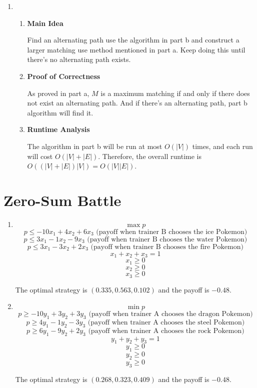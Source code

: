 \documentclass[11pt]{article}
\newenvironment{qparts}{\begin{enumerate}[{(}a{)}]}{\end{enumerate}}
\begin{document}
\begin{qparts}
\begin{enumerate}
		The modified BFS will not change overall runtime. Therefore it is $O(|V| + |E|)$.
		
	\end{enumerate}
	
	\item
	\renewcommand{\theenumii}{\roman{enumii}}
	\begin{enumerate}
		\item \textbf{Main Idea}
		
		Find an alternating path use the algorithm in part b and construct a larger matching use method mentioned in part a.
		Keep doing this until there's no alternating path exists.
		
		\item \textbf{Proof of Correctness}
		
		As proved in part a, $M$ is a maximum matching if and only if there does not exist an alternating path. And if there's an alternating path, part b algorithm will find it.
		
		\item \textbf{Runtime Analysis}
		
		The algorithm in part b will be run at most $O(|V|)$ times, and each run will cost $O(|V| + |E|)$.
		Therefore, the overall runtime is  $O((|V| + |E|)|V|) = O(|V||E|)$.
		
	\end{enumerate}
	
\end{qparts}


\newpage
\section{Zero-Sum Battle}
\begin{qparts}
	
	\item 
	
	\[
		\max p
	\]
	\[
		p \le -10x_1 +4x_2 + 6x_3 \text{ (payoff when trainer B chooses the ice Pokemon)}
	\]
	\[
		p \le 3x_1 -1x_2 - 9x_3 \text{ (payoff when trainer B chooses the water Pokemon)}
	\]
	\[
		p \le 3x_1 -3x_2 + 2x_3 \text{ (payoff when trainer B chooses the fire Pokemon)}
	\]
	\[
		x_1 + x_2 + x_3 = 1
	\]
	\[
		x_1 \ge 0
	\]
	\[
		x_2 \ge 0
	\]
	\[
		x_3 \ge 0
	\]
	
	The optimal strategy is $(0.335, 0.563, 0.102)$ and the payoff is $-0.48$.
		
	\item 
	
	\[
		\min p
	\]
	\[
		p \ge -10y_1 + 3y_2 + 3y_3 \text{ (payoff when trainer A chooses the dragon Pokemon)}
	\]
	\[
		p \ge 4y_1 -1y_2 - 3y_3 \text{ (payoff when trainer A chooses the steel Pokemon)}
	\]
	\[
		p \ge 6y_1 -9y_2 + 2y_3 \text{ (payoff when trainer A chooses the rock Pokemon)}
	\]
	\[
		y_1 + y_2 + y_3 = 1
	\]
	\[
		y_1 \ge 0
	\]
	\[
		y_2 \ge 0
	\]
	\[
		y_3 \ge 0
	\]
	
	The optimal strategy is $(0.268, 0.323, 0.409)$ and the payoff is $-0.48$.

\end{qparts}
\end{document}

